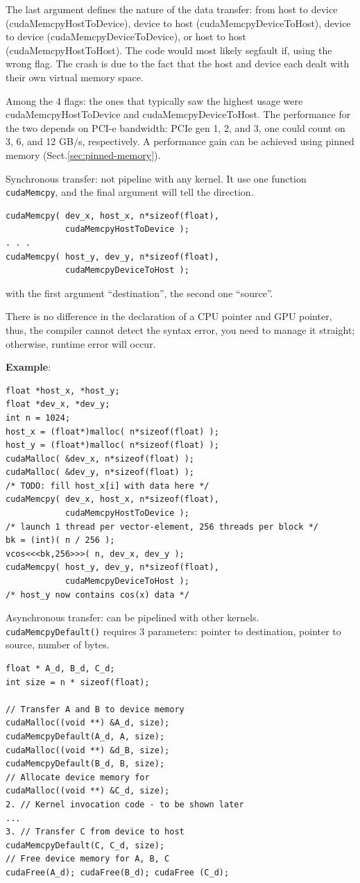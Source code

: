 The last argument defines the nature of the data transfer: from host to device
(cudaMemcpyHostToDevice), device to host (cudaMemcpyDeviceToHost), device to
device (cudaMemcpyDeviceToDevice), or host to host (cudaMemcpyHostToHost).
The code would most likely segfault if, using the wrong flag.
The crash is due to the fact that the host and device each dealt with their own virtual memory space.

Among the 4 flags:  the ones that typically saw the highest usage were
cudaMemcpyHostToDevice and cudaMemcpyDeviceToHost. The performance for the two
depends on PCI-e bandwidth: PCIe gen 1, 2, and 3, one could count on 3, 6, and
12 GB/s, respectively. A performance gain can be achieved using pinned memory (Sect.\ref{sec:pinned-memory}).

Synchronous transfer: not pipeline with any kernel.  It use one
function \verb!cudaMemcpy!, and the final argument will tell the
direction.
\begin{lstlisting}
cudaMemcpy( dev_x, host_x, n*sizeof(float), 
            cudaMemcpyHostToDevice );
. . .
cudaMemcpy( host_y, dev_y, n*sizeof(float), 
            cudaMemcpyDeviceToHost );
\end{lstlisting}
with the first argument ``destination'', the second one ``source''.

There is no difference in the declaration of a CPU pointer and GPU
pointer, thus, the compiler cannot detect the syntax error, you need
to manage it straight; otherwise, runtime error will occur.


{\bf Example}:
\begin{lstlisting}
float *host_x, *host_y;
float *dev_x, *dev_y;
int n = 1024;
host_x = (float*)malloc( n*sizeof(float) );
host_y = (float*)malloc( n*sizeof(float) );
cudaMalloc( &dev_x, n*sizeof(float) );
cudaMalloc( &dev_y, n*sizeof(float) );
/* TODO: fill host_x[i] with data here */
cudaMemcpy( dev_x, host_x, n*sizeof(float), 
            cudaMemcpyHostToDevice );
/* launch 1 thread per vector-element, 256 threads per block */
bk = (int)( n / 256 );
vcos<<<bk,256>>>( n, dev_x, dev_y );
cudaMemcpy( host_y, dev_y, n*sizeof(float), 
            cudaMemcpyDeviceToHost );
/* host_y now contains cos(x) data */
\end{lstlisting}


Asynchronous transfer: can be pipelined with other kernels.
\verb!cudaMemcpyDefault()! requires 3 parameters: pointer to
destination, pointer to source, number of bytes.
\begin{lstlisting}
float * A_d, B_d, C_d;
int size = n * sizeof(float);

// Transfer A and B to device memory
cudaMalloc((void **) &A_d, size);
cudaMemcpyDefault(A_d, A, size);
cudaMalloc((void **) &d_B, size);
cudaMemcpyDefault(B_d, B, size);
// Allocate device memory for
cudaMalloc((void **) &C_d, size);
2. // Kernel invocation code - to be shown later
...
3. // Transfer C from device to host
cudaMemcpyDefault(C, C_d, size);
// Free device memory for A, B, C
cudaFree(A_d); cudaFree(B_d); cudaFree (C_d);
\end{lstlisting}


